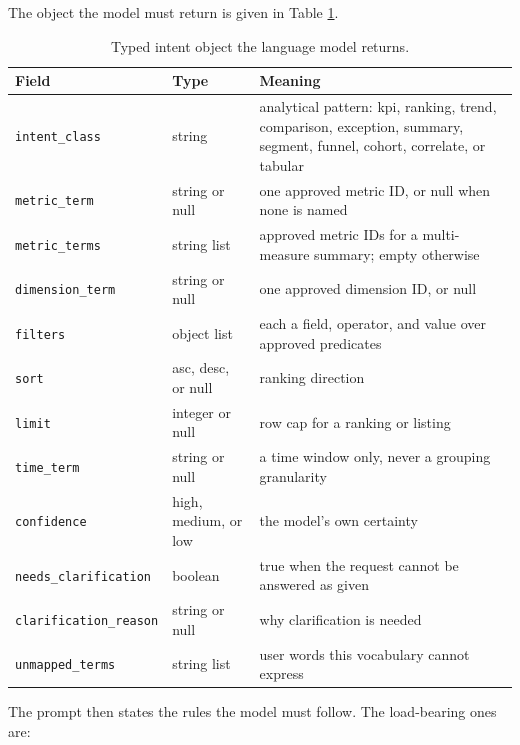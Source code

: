 \documentclass[pdflatex,sn-mathphys-num]{sn-jnl}
\begin{document}
The object the model must return is given in Table \ref{tab:9}.


\begin{table}[t]
\caption{Typed intent object the language model returns.}
\label{tab:9}
\centering
\renewcommand{\arraystretch}{1.15}
\begin{tabular}{p{}lp{}}
\toprule
Field & Type & Meaning \\
\midrule
\texttt{intent\_class} & string & analytical pattern: kpi, ranking, trend, comparison, exception, summary, segment, funnel, cohort, correlate, or tabular \\
\texttt{metric\_term} & string or null & one approved metric ID, or null when none is named \\
\texttt{metric\_terms} & string list & approved metric IDs for a multi-measure summary; empty otherwise \\
\texttt{dimension\_term} & string or null & one approved dimension ID, or null \\
\texttt{filters} & object list & each a field, operator, and value over approved predicates \\
\texttt{sort} & asc, desc, or null & ranking direction \\
\texttt{limit} & integer or null & row cap for a ranking or listing \\
\texttt{time\_term} & string or null & a time window only, never a grouping granularity \\
\texttt{confidence} & high, medium, or low & the model's own certainty \\
\texttt{needs\_clarification} & boolean & true when the request cannot be answered as given \\
\texttt{clarification\_reason} & string or null & why clarification is needed \\
\texttt{unmapped\_terms} & string list & user words this vocabulary cannot express \\
\bottomrule
\end{tabular}
\end{table}

The prompt then states the rules the model must follow. The load-bearing ones are:
\end{document}
